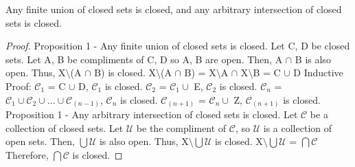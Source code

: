 \documentclass{article}
\begin{document}
  \begin{proposition}
      Any finite union of closed sets is closed, and any arbitrary intersection of closed sets is closed.
  \end{proposition}

  \begin{proof}
  	Proposition 1 - Any finite union of closed sets is closed.
  	\newline
  	Let C, D be closed sets.
  	\newline
  	Let A, B be compliments of C, D so A, B are open.
  	\newline
  	Then, A $\cap$ B is also open.
  	\newline
  	Thus, X$\setminus$(A $\cap$ B) is closed.
  	\newline
  	X$\setminus$(A $\cap$ B) = X$\setminus$A $\cap$ X$\setminus$B = C $\cup$ D
  	\newline\newline
  	Inductive Proof:
  	\newline
  	$\mathcal{C}_1$ = C $\cup$ D, $\mathcal{C}_1$ is closed.
  	\newline
  	$\mathcal{C}_2$ = $\mathcal{C}_1 \cup$ E, $\mathcal{C}_2$ is closed.
  	\newline
  	$\mathcal{C}_n$ = $\mathcal{C}_1 \cup \mathcal{C}_2 \cup ... \cup \mathcal{C}_(n-1)$, $\mathcal{C}_n$ is closed.
  	\newline
  	$\mathcal{C}_(n+1)$ = $\mathcal{C}_n \cup$ Z, $\mathcal{C}_(n+1)$ is closed.
  	\newline\newline
  	Proposition 1 - Any arbitrary intersection of closed sets is closed.
  	\newline
  	Let $\mathcal{C}$ be a collection of closed sets.
  	\newline
  	Let $\mathcal{U}$ be the compliment of $\mathcal{C}$, so $\mathcal{U}$ is a collection of open sets.
  	\newline
  	Then, $\bigcup \mathcal{U}$ is also open.
  	\newline
  	Thus, X$\setminus\bigcup\mathcal{U}$ is closed.
  	\newline
  	X$\setminus\bigcup\mathcal{U}$ = $\bigcap\mathcal{C}$
  	\newline
  	Therefore, $\bigcap\mathcal{C}$ is closed.
	\end{proof}
\end{document}
